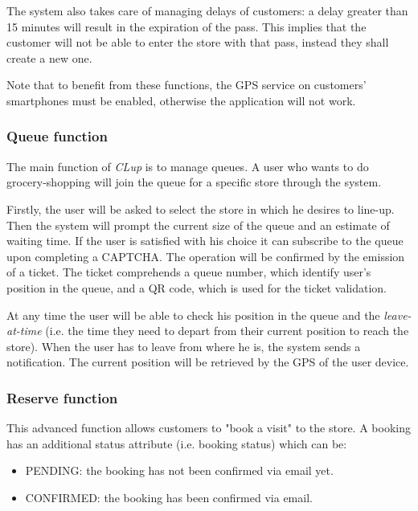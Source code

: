 	The system also takes care of managing delays of customers: a delay greater than 15 minutes will result in the expiration of the pass. This implies that the customer will not be able to enter the store with that pass, instead they shall create a new one.\newline

	Note that to benefit from these functions, the GPS service on customers' smartphones must be enabled, otherwise the application will not work.

	\subsubsection{Queue function}
	The main function of \textit{CLup} is to manage queues. A user who wants to do grocery-shopping will join the queue for a specific store through the system.\newline

	Firstly, the user will be asked to select the store in which he desires to line-up.\newline
	Then the system will prompt the current size of the queue and an estimate of waiting time. If the user is satisfied with his choice it can subscribe to the queue upon completing a CAPTCHA. The operation will be confirmed by the emission of a ticket. The ticket comprehends a queue number, which identify user's position in the queue, and a QR code, which is used for the ticket validation.

	At any time the user will be able to check his position in the queue and the \textit{leave-at-time} (i.e. the time they need to depart from their current position to reach the store). When the user has to leave from where he is, the system sends a notification. The current position will be retrieved by the GPS of the user device.

	\subsubsection{Reserve function}
	This advanced function allows customers to "book a visit" to the store.
	A booking has an additional status attribute (i.e. booking status) which can be:
	\begin{itemize}
		\item PENDING: the booking has not been confirmed via email yet.
		\item CONFIRMED: the booking has been confirmed via email.
	\end{itemize}

